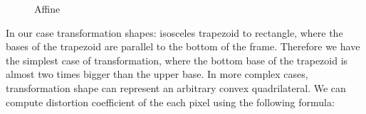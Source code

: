 \documentclass[a4paper,12pt]{article} %
\begin{document}
\begin{enumerate}
\begin{enumerate}
		\begin{figure}
			\begin{minipage}[h]{0.49\linewidth}
			\end{minipage}
			\hfill
			\begin{minipage}[h]{0.49\linewidth}
			\end{minipage}
		
		\caption{Affine}
		\label{fig:affine}
		\end{figure}

		\hspace{0.05cm}

		In our case transformation shapes: isosceles trapezoid to rectangle, where the bases of the trapezoid are parallel to the bottom of the frame. Therefore we have the simplest case of transformation, where the bottom base of the trapezoid is almost two times bigger than the upper base. In more complex cases, transformation shape can represent an arbitrary convex quadrilateral. We can compute distortion coefficient of the each pixel using the following formula: 


\end{enumerate}
\end{enumerate}
\end{document}
